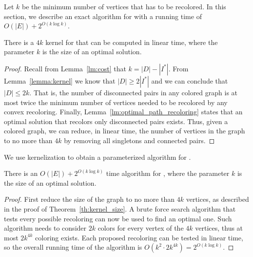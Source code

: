 \label{sec:fpt}

Let $k$ be the minimum number of vertices that has to be recolored. In this
section, we describe an exact algorithm for \TWOCR{} with a running time
of $O(|E|) + 2^{O(k \log k)}$.

\begin{theorem}
\label{th:kernel_size}
There is a $4k$ kernel for \TWOCR{} that can be computed in linear time, where the
parameter $k$ is the size of an optimal solution.
\end{theorem}

\begin{proof}
Recall from Lemma~\ref{lm:cost} that $k = |D| - |I^*|$.
From Lemma~\ref{lemma:kernel} we know that $|D| \geq 2|I^*|$ and we can
conclude that $|D| \leq 2k$.
That is, the number of disconnected pairs in any colored graph is at most twice
the minimum number of vertices needed to be recolored by any convex recoloring.
Finally, Lemma~\ref{lm:optimal_path_recoloring} states that an optimal solution
that recolors only disconnected pairs exists.
Thus, given a colored graph, we can reduce, in linear time, the number of
vertices in the graph to no more than $4k$ by removing all singletons and connected
pairs.{}
\end{proof}

We use kernelization to obtain a parameterized algorithm for \TWOCR{}.

\begin{theorem}
There is an $O(|E|) + 2^{O(k\log{k})}$ time algorithm for \TWOCR{}, where
the parameter $k$ is the size of an optimal solution.
\end{theorem}

\begin{proof}
	First reduce the size of the graph to no more than $4k$ vertices, as described
	in the proof of Theorem~\ref{th:kernel_size}.
	A brute force search algorithm
	that tests every possible recoloring can now be used to find an optimal one.
	Such algorithm needs to consider $2k$ colors for every vertex of the $4k$
	vertices, thus at most $2k^{4k}$ coloring exists. 
	Each proposed recoloring can be tested in linear time, so the overall running
	time of the algorithm is $O(k^2 \cdot 2k^{4k}) =  2^{O(k\log{k})}$.
{}\end{proof}

